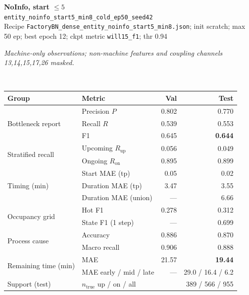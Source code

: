 \documentclass[9pt,a4paper,twocolumn]{extarticle}
\begin{document}
\noindent\begin{minipage}{\columnwidth}
\begin{center}
{\small\bfseries NoInfo, start $\le 5$}\\
{\scriptsize\texttt{entity\_noinfo\_start5\_min8\_cold\_ep50\_seed42}}\\
{\scriptsize Recipe \texttt{FactoryBN\_dense\_entity\_noinfo\_start5\_min8.json}; init scratch; max 50 ep; best epoch 12; ckpt metric \texttt{will15\_f1}; thr 0.94}\\[1pt]
\parbox{0.96\columnwidth}{\scriptsize\itshape Machine-only observations; non-machine features and coupling channels 13,14,15,17,26 masked.}\\[2pt]
\scriptsize\setlength{\tabcolsep}{3pt}
\begin{tabular}{llrr}
\toprule
Group & Metric & Val & Test \\
\midrule
\multirow{3}{*}{Bottleneck report}
  & Precision $P$ & 0.802 & 0.770 \\
  & Recall $R$ & 0.539 & 0.553 \\
  & F1 & 0.645 & \textbf{0.644} \\
\midrule
\multirow{2}{*}{Stratified recall}
  & Upcoming $R_{\mathrm{up}}$ & 0.056 & 0.049 \\
  & Ongoing $R_{\mathrm{on}}$ & 0.895 & 0.899 \\
\midrule
\multirow{3}{*}{Timing (min)}
  & Start MAE (tp) & 0.05 & 0.02 \\
  & Duration MAE (tp) & 3.47 & 3.55 \\
  & Duration MAE (union) & --- & 6.66 \\
\midrule
\multirow{2}{*}{Occupancy grid}
  & Hot F1 & 0.278 & 0.312 \\
  & State F1 (1 step) & --- & 0.699 \\
\midrule
\multirow{2}{*}{Process cause}
  & Accuracy & 0.886 & 0.870 \\
  & Macro recall & 0.906 & 0.888 \\
\midrule
\multirow{2}{*}{Remaining time (min)}
  & MAE & 21.57 & \textbf{19.44} \\
  & MAE early / mid / late & --- & 29.0 / 16.4 / 6.2 \\
\midrule
Support (test)
  & $n_{\mathrm{true}}$ up / on / all & \multicolumn{2}{r}{389 / 566 / 955} \\
\bottomrule
\end{tabular}
\end{center}
\end{minipage}\par\vspace{6pt}
\end{document}
